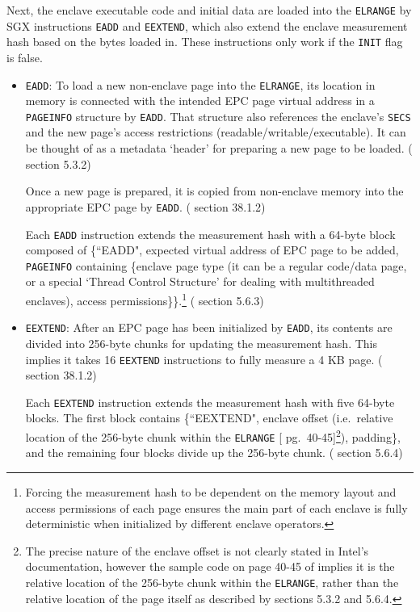 Next, the enclave executable code and initial data are loaded into the {\tt ELRANGE} by SGX instructions {\tt EADD} and {\tt EEXTEND}, which also extend the enclave measurement hash based on the bytes loaded in. These instructions only work if the {\tt INIT} flag is false.

\begin{itemize}
    \item {\tt EADD}: To load a new non-enclave page into the {\tt ELRANGE}, its location in memory is connected with the intended EPC page virtual address in a {\tt PAGEINFO} structure by {\tt EADD}. That structure also references the enclave's {\tt SECS} and the new page's access restrictions (readable/writable/executable). It can be thought of as a metadata `header' for preparing a new page to be loaded. (\cite{intel-sgx-explained-advanced} section 5.3.2)

    Once a new page is prepared, it is copied from non-enclave memory into the appropriate EPC page by {\tt EADD}. (\cite{sgx-manual} section 38.1.2)

    Each {\tt EADD} instruction extends the measurement hash with a 64-byte block composed of \{``EADD", expected virtual address of EPC page to be added, {\tt PAGEINFO} containing \{enclave page type (it can be a regular code/data page, or a special `Thread Control Structure' for dealing with multithreaded enclaves), access permissions\}\}.\footnote{Forcing the measurement hash to be dependent on the memory layout and access permissions of each page ensures the main part of each enclave is fully deterministic when initialized by different enclave operators.} (\cite{intel-sgx-explained-advanced} section 5.6.3)

    \item {\tt EEXTEND}: After an EPC page has been initialized by {\tt EADD}, its contents are divided into 256-byte chunks for updating the measurement hash. This implies it takes 16 {\tt EEXTEND} instructions to fully measure a 4 KB page. (\cite{sgx-manual} section 38.1.2)

    Each {\tt EEXTEND} instruction extends the measurement hash with five 64-byte blocks. The first block contains \{``EEXTEND", enclave offset (i.e.\ relative location of the 256-byte chunk within the {\tt ELRANGE} [\cite{sgx-manual} pg.\ 40-45]\footnote{The precise nature of the enclave offset is not clearly stated in Intel's documentation, however the sample code on page 40-45 of \cite{sgx-manual} implies it is the relative location of the 256-byte chunk within the {\tt ELRANGE}, rather than the relative location of the page itself as described by \cite{intel-sgx-explained-advanced} sections 5.3.2 and 5.6.4.}), padding\}, and the remaining four blocks divide up the 256-byte chunk. (\cite{intel-sgx-explained-advanced} section 5.6.4)
\end{itemize}

